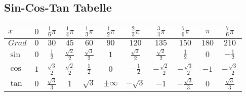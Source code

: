 \documentclass[a4paper, 10pt, landscape]{article}
\begin{document}
\begin{multicols}{2}
\begin{tiny}
	\section{Sin-Cos-Tan Tabelle}
		\begin{tabular}{l | c  c  c  c  c  c  c  c  c  c }
			\noindent
			$x$ & $0$ & $\frac{1}{6}\pi$ & $\frac{1}{4}\pi$ & $\frac{1}{3}\pi$ & $\frac{1}{2}\pi$ & $\frac{2}{3}\pi$ & $\frac{3}{4}\pi$ & $\frac{5}{6}\pi$ & $\pi$ & $\frac{7}{6}\pi$\\\hline
			$Grad$ & $0$ & $30$ & $45$ & $60$ & $90$ & $120$ & $135$ & $150$ & $180$ & $210$\\\hline
			$\sin$ & $0$ & $\frac{1}{2}$ & $\frac{\sqrt{2}}{2}$ & $\frac{\sqrt{3}}{2}$ & $1$ & $\frac{\sqrt{3}}{2}$ & $\frac{\sqrt{2}}{2}$ & $\frac{1}{2}$ & $0$ & $-\frac{1}{2}$\\\hline
			$\cos$ & $1$ & $\frac{\sqrt{3}}{2}$ & $\frac{\sqrt{2}}{2}$ & $\frac{1}{2}$ & $0$ & $-\frac{1}{2}$ & $-\frac{\sqrt{2}}{2}$ & $-\frac{\sqrt{3}}{2}$ & $-1$ & $-\frac{\sqrt{3}}{2}$\\\hline
			$\tan$ & $0$ & $\frac{\sqrt{3}}{3}$ & $1$ & $\sqrt{3}$ &$\pm\infty$ & $-\sqrt{3}$ & $-1$ & $-\frac{\sqrt{3}}{3}$ & $0$ & $\frac{\sqrt{3}}{3}$
		\end{tabular}
	\end{tiny}
\end{multicols}
\end{document}
